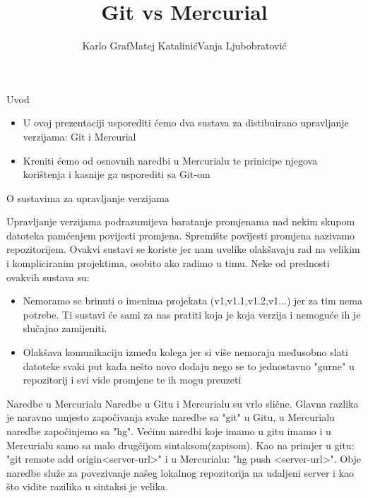 \documentclass{beamer}
\title[]{Git vs Mercurial}
\author{Karlo Graf\newline Matej Katalinić\newline Vanja Ljubobratović}
\institute{Tehnički Fakultet, Sveučilište u Rijeci}
\begin{document}
\begin{frame}
  \titlepage
\end{frame}


\begin{frame}{Uvod}

\begin{itemize}
  \item U ovoj prezentaciji usporediti ćemo dva sustava za distibuirano upravljanje verzijama: Git i Mercurial
  \item Kreniti ćemo od osnovnih naredbi u Mercurialu te prinicipe njegova korištenja i kasnije ga usporediti sa Git-om
\end{itemize}

\vskip 1cm


\end{frame}

\begin{frame}{O sustavima za upravljanje verzijama}

Upravljanje verzijama podrazumijeva baratanje promjenama nad nekim skupom datoteka pamćenjem povijesti promjena. Spremište povijesti promjena nazivamo repozitorijem. Ovakvi sustavi se koriste jer nam uvelike olakšavaju rad na velikim i kompliciranim projektima, osobito ako radimo u timu. Neke od prednosti ovakvih sustava su:
\begin{itemize}
  \item Nemoramo se brinuti o imenima projekata (v1,v1.1,v1.2,v1...) jer za tim nema potrebe. Ti sustavi će sami za nas pratiti koja je koja verzija i nemoguće ih je slučajno zamijeniti.
  \item Olakšava komunikaciju između kolega jer si više nemoraju međusobno slati datoteke svaki put kada nešto novo dodaju nego se to jednostavno "gurne" u repozitorij i svi vide promjene te ih mogu preuzeti
\end{itemize}
\end{frame}
\begin{frame}{Naredbe u Mercurialu}
Naredbe u Gitu i Mercurialu su vrlo slične. Glavna razlika je naravno umjesto započivanja svake naredbe sa "git" u Gitu, u Mercurialu naredbe započinjemo sa "hg". Većinu naredbi koje imamo u gitu imamo i u Mercurialu samo sa malo drugčijom sintaksom(zapisom). Kao na primjer u gitu: "git remote add origin<server-url>" i u Mercurialu: "hg push <server-url>". Obje naredbe služe za povezivanje našeg lokalnog repozitorija na udaljeni server i kao što vidite razilika u sintaksi je velika. 

\end{frame}
\end{document}
